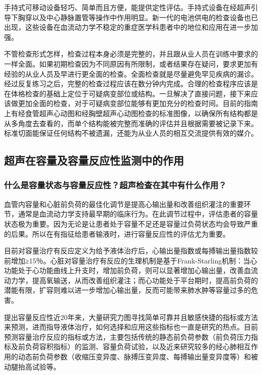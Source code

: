 手持式可移动设备轻巧、简单而且方便，能提供定性评估。手持式设备在经超声引导下胸穿以及中心静脉置管等操作中作用明显。新一代的电池供电的检查设备也已出现，这些设备在血流动力学不稳定的重症医学科患者中的地位和应用在进一步加强。

不管检查形式怎样，检查过程本身必须是完整的，并且跟从业人员在训练中要求的一样全面。如果初期检查因为不同原因有所限制，或者结果存在疑问，要求更加有经验的从业人员及早进行更全面的检查。全面检查就是尽量避免罕见疾病的漏诊。经过反复练习之后，完整的检查过程应该在数分钟内完成。合理的检查程序应该是在体格检查的基础上定位于可疑病变部位或结构。一旦解决了直接问题，接下来应该做更加全面的检查，对于可疑病变部位能够有更加充分的检查时间。目前的指南上有经食管超声心动图和经胸壁超声心动图检查的标准图像，以确保所有结构都是从多角度去查看的，而单个结构能被完整而准确的评估并且根据需要被记录下来。标准切面能保证任何结构不被遗漏，还能为从业人员的相互交流提供有效的媒介。

\subsection{超声在容量及容量反应性监测中的作用}

\subsubsection{什么是容量状态与容量反应性？超声检查在其中有什么作用？}

血管内容量和心脏前负荷的最佳化调节是提高心输出量和改善组织灌注的重要环节，通常是血流动力学支持最早期的临床行为。在此调节过程中，评估患者的容量状态极为重要。因为无论是让患者处于容量不足还是容量过负荷状态均会导致严重的后果。所以在有指征给患者输液时，进行容量反应性的评估尤为重要。

目前对容量治疗有反应定义为给予液体治疗后，心输出量指数或每搏输出量指数较前增加≥15％。心脏对容量治疗有反应的生理机制是基于Frank-Starling机制：当心功能处于心功能曲线上升支时，增加前负荷，则可以显著增加心输出量，改善血流动力学，提高氧输送，从而改善组织灌注；而心功能处于平台期时，提高前负荷的潜能有限，扩容则难以进一步增加心输出量，反而可能带来肺水肿等容量过多的危害。

提出容量反应性近20年来，大量研究力图寻找简单可靠并且敏感快捷的指标或方法来预测，进而指导液体治疗，如何选择和应用这些指标也一直是研究的热点。目前预测容量治疗反应的指标或方法，主要包括传统的静态前负荷参数（前负荷压力指标及前负荷容积指标）的监测、容量负荷试验，以及近来研究较多的经心肺相互作用的动态前负荷参数（收缩压变异度、脉搏压变异度、每搏输出量变异度等）和被动腿抬高试验等。

